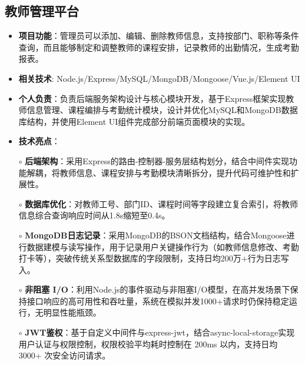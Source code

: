 \subsection{\textbf{教师管理平台} \hspace{2cm}{2024.05 -- 2024.06}}
    \begin{normalsize}
      \begin{itemize}
        \item \textbf{项目功能}：管理员可以添加、编辑、删除教师信息，支持按部门、职称等条件查询，而且能够制定和调整教师的课程安排，记录教师的出勤情况，生成考勤报表。
        \item \textbf{相关技术}: Node.js/Express/MySQL/MongoDB/Mongoose/Vue.js/Element UI
        \item \textbf{个人负责}：负责后端服务架构设计与核心模块开发，基于Express框架实现教师信息管理、课程编排与考勤统计模块，设计并优化MySQL和MongoDB数据库结构，并使用Element UI组件完成部分前端页面模块的实现。
        \item \textbf{技术亮点}：
        \setlength{\itemindent}{1em} %
          \item[$\circ$] \textbf{后端架构}：采用Express的路由-控制器-服务层结构划分，结合中间件实现功能解耦，将教师信息、课程安排与考勤模块清晰拆分，提升代码可维护性和扩展性。
          \item[$\circ$] \textbf{数据库优化}：对教师工号、部门ID、课程时间等字段建立复合索引，将教师信息综合查询响应时间从1.8s缩短至0.4s。
          \item[$\circ$] \textbf{MongoDB日志记录}：采用MongoDB的BSON文档结构，结合Mongoose进行数据建模与读写操作，用于记录用户关键操作行为（如教师信息修改、考勤打卡等），突破传统关系型数据库的字段限制，支持日均200万+行为日志写入。
          \item[$\circ$] \textbf{非阻塞 I/O}：利用Node.js的事件驱动与非阻塞I/O模型，在高并发场景下保持接口响应的高可用性和吞吐量，系统在模拟并发1000+请求时仍保持稳定运行，无明显性能瓶颈。
          \item[$\circ$] \textbf{JWT鉴权}：基于自定义中间件与express-jwt，结合async-local-storage实现用户认证与权限控制，权限校验平均耗时控制在 200ms 以内，支持日均 3000+ 次安全访问请求。
        \end{itemize}
    \end{normalsize}